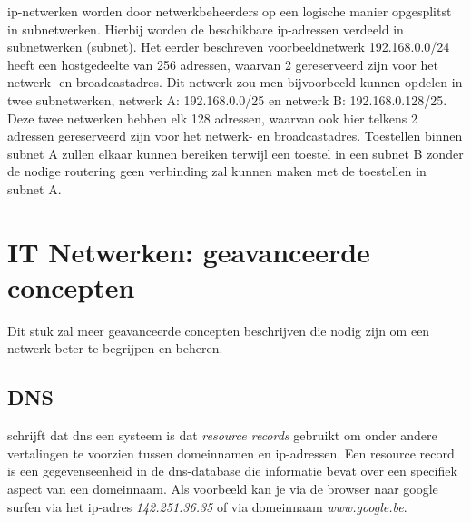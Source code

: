 {\acrshort{ip}-netwerken worden door netwerkbeheerders op een logische manier opgesplitst in subnetwerken. Hierbij worden de beschikbare \acrshort{ip}-adressen verdeeld in subnetwerken (subnet). Het eerder beschreven voorbeeldnetwerk 192.168.0.0/24 heeft een hostgedeelte van 256 adressen, waarvan 2 gereserveerd zijn voor het netwerk- en broadcastadres. Dit netwerk zou men bijvoorbeeld kunnen opdelen in twee subnetwerken, netwerk A: 192.168.0.0/25 en netwerk B: 192.168.0.128/25. Deze twee netwerken hebben elk 128 adressen, waarvan ook hier telkens 2 adressen gereserveerd zijn voor het netwerk- en broadcastadres.
Toestellen binnen subnet A zullen elkaar kunnen bereiken terwijl een toestel in een subnet B zonder de nodige routering geen verbinding zal kunnen maken met de toestellen in subnet A.

\section{IT Netwerken: geavanceerde concepten}
Dit stuk zal meer geavanceerde concepten beschrijven die nodig zijn om een netwerk beter te begrijpen en beheren.

\subsection{DNS}
\textcite{Mockapetris1987} schrijft dat \acrshort{dns} een systeem is dat \textit{resource records} gebruikt om onder andere vertalingen te voorzien tussen domeinnamen en \acrshort{ip}-adressen. Een resource record is een gegevenseenheid in de \acrshort{dns}-database die informatie bevat over een specifiek aspect van een domeinnaam. Als voorbeeld kan je via de browser naar google surfen via het \acrshort{ip}-adres \textit{142.251.36.35} of via domeinnaam \textit{www.google.be}. 

}
